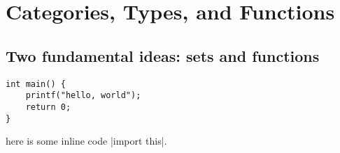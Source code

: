 \documentclass[12pt]{article}
\theoremstyle{definition}
\begin{document}

\tableofcontents
\section{Categories, Types, and Functions}
\subsection{Two fundamental ideas: sets and functions}

\begin{verbatim}
int main() {
    printf("hello, world");
    return 0;
}
\end{verbatim}

here is some inline code |import this|.


\printindex
\end{document}
